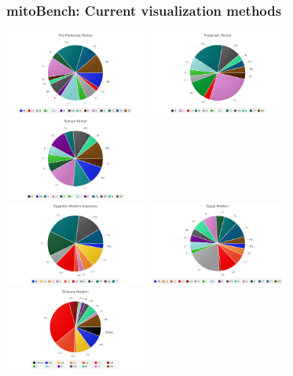 \documentclass{beamer} %
\begin{document}
\begin{frame}
	\frametitle{mitoBench: Current visualization methods}
	\begin{center}
		\includegraphics[width=0.35\textwidth]{imagesBench/piechart_preptolemaic.png}
		\includegraphics[width=0.35\textwidth]{imagesBench/piechart_ptolemaic.png}
		\includegraphics[width=0.35\textwidth]{imagesBench/piechart_roman.png}
		\\
		\includegraphics[width=0.35\textwidth]{imagesBench/piechart_kujanova.png}
		\includegraphics[width=0.35\textwidth]{imagesBench/piechart_egypt.png}
		\includegraphics[width=0.35\textwidth]{imagesBench/piechart_ethiopia.png}
		\end{center}
\end{frame}
\end{document}
